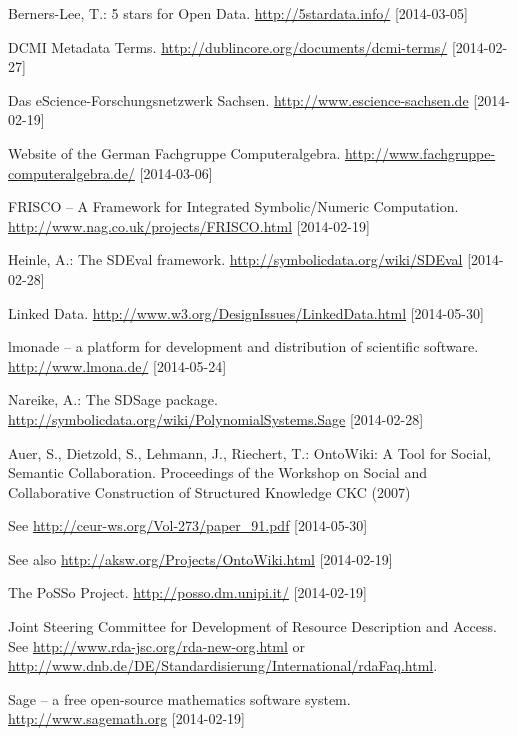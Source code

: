 \documentclass{llncs}
\begin{document}
\raggedright
\begin{thebibliography}{1}

 Berners-Lee, T.: 5 stars for Open Data.
  \url{http://5stardata.info/} [2014-03-05]

 DCMI Metadata Terms.
  \url{http://dublincore.org/documents/dcmi-terms/} [2014-02-27]

 Das eScience-Forschungsnetzwerk Sachsen.
  \newblock \url{http://www.escience-sachsen.de} [2014-02-19]

 Website of the German Fachgruppe Computeralgebra.  
  \url{http://www.fachgruppe-computeralgebra.de/} [2014-03-06]

 FRISCO -- A Framework for Integrated Symbolic/Numeric
  Computation. \url{http://www.nag.co.uk/projects/FRISCO.html} [2014-02-19]

 Heinle, A.: The SDEval framework.  
  \url{http://symbolicdata.org/wiki/SDEval} [2014-02-28]

 Linked Data.  \url{http://www.w3.org/DesignIssues/LinkedData.html}
  [2014-05-30]

 lmonade -- a platform for development and distribution of
  scientific software.  \url{http://www.lmona.de/}
  [2014-05-24]

 Nareike, A.: The SDSage package.  
  \url{http://symbolicdata.org/wiki/PolynomialSystems.Sage} [2014-02-28]

 Auer, S., Dietzold, S., Lehmann, J., Riechert, T.:
  OntoWiki: A Tool for Social, Semantic Collaboration.  Proceedings of the
  Workshop on Social and Collaborative Construction of Structured Knowledge
  CKC (2007)

  See \url{http://ceur-ws.org/Vol-273/paper_91.pdf} [2014-05-30]

  See also \url{http://aksw.org/Projects/OntoWiki.html} [2014-02-19]

 The PoSSo Project. \url{http://posso.dm.unipi.it/}
  [2014-02-19]

 Joint Steering Committee for Development of Resource Description
  and Access. See \url{http://www.rda-jsc.org/rda-new-org.html} or
  \url{http://www.dnb.de/DE/Standardisierung/International/rdaFaq.html}.

 Sage -- a free open-source mathematics software system.
  \url{http://www.sagemath.org} [2014-02-19]


\end{thebibliography}
\end{document}
